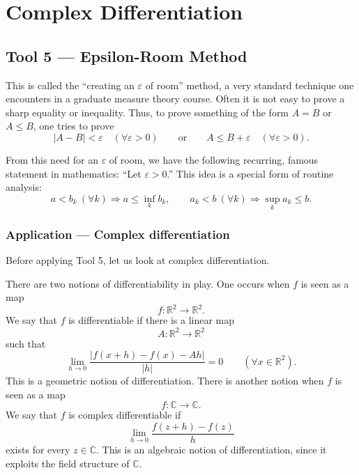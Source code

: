 \documentclass[11pt,a4paper]{article}
\begin{document}
\section*{Complex Differentiation}
\subsection*{Tool 5 — Epsilon-Room Method}
This is called the ``creating an $\varepsilon$ of room'' method, a very standard technique one encounters in a graduate measure theory course. Often it is not easy to prove a sharp equality or inequality. Thus, to prove something of the form $A=B$ or $A\leq B$, one tries to prove
\[
|A-B|<\varepsilon\quad(\forall\varepsilon>0)
\qquad\text{or}\qquad
A\leq B+\varepsilon\quad(\forall\varepsilon>0).
\]


From this need for an $\varepsilon$ of room, we have the following recurring, famous statement in mathematics: ``Let $\varepsilon>0$.'' This idea is a special form of routine analysis:
\[
a<b_k\ (\forall k)\Longrightarrow a\leq\inf_k b_k,
\qquad
a_k<b\ (\forall k)\Longrightarrow\sup_k a_k\leq b.
\]

\subsubsection*{Application — Complex differentiation}
Before applying Tool 5, let us look at complex differentiation.

There are two notions of differentiability in play. One occurs when $f$ is seen as a map
\[
f\colon\mathbb R^2\longrightarrow\mathbb R^2.
\]
We say that $f$ is differentiable if there is a linear map
\[
A\colon\mathbb R^2\longrightarrow\mathbb R^2
\]
such that
\[
\lim_{h\to0}\frac{|f(x+h)-f(x)-Ah|}{|h|}=0
\qquad(\forall x\in\mathbb R^2).
\]
This is a geometric notion of differentiation. There is another notion when $f$ is seen as a map
\[
f\colon\mathbb C\longrightarrow\mathbb C.
\]
We say that $f$ is complex differentiable if
\[
\lim_{h\to0}\frac{f(z+h)-f(z)}{h}
\]
exists for every $z\in\mathbb C$. This is an algebraic notion of differentiation, since it exploits the field structure of $\mathbb C$.
\end{document}
